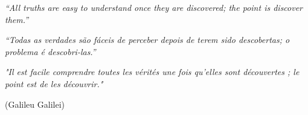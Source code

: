 
\begin{epigrafe}



\textit{“All truths are easy to understand once they are discovered; the point is discover them.”}

\textit{“Todas as verdades são fáceis de perceber depois de terem sido descobertas; o problema é descobri-las.”}

\textit{"Il est facile comprendre toutes les vérités une fois qu'elles sont découvertes ; le point est de les découvrir."}

(Galileu Galilei)





\end{epigrafe}

